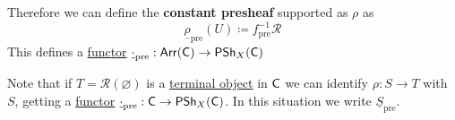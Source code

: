 \documentclass[../../../main]{subfiles}
\begin{document}
\begin{example}
  Therefore we can define the \textbf{constant presheaf} supported as \(\rho\) as
  \begin{equation*}
    \underline{\rho}_{\operatorname{pre}}(U) \coloneq  f_{\operatorname{pre}}^{-1}\mathcal{R}
  \end{equation*}
  This defines a \hyperref[def:functor]{functor} \(\underline{\cdot}_{\operatorname{pre}}: \mathsf{Arr}(\mathsf{C}) \to \mathsf{PSh}_{X}(\mathsf{C})\)

  Note that if \(T = \mathcal{R}(\varnothing)\) is a \hyperref[def:initial-terminal-object]{terminal object} in \(\mathsf{C}\) we can identify \(\rho: S \to T\) with \(S\), getting a \hyperref[def:functor]{functor} \(\underline{\cdot}_{\operatorname{pre}}: \mathsf{C} \to \mathsf{PSh}_{X}(\mathsf{C})\).
  In this situation we write \(\underline{S}_{\operatorname{pre}}\).
\end{example}
\end{document}
